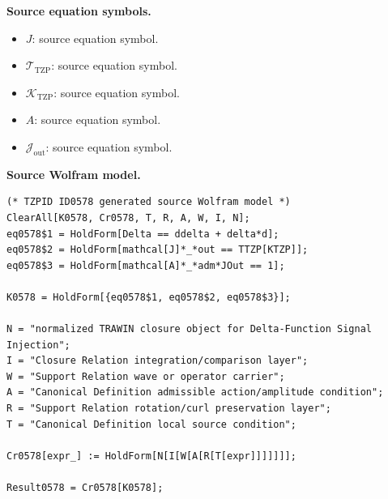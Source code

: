 \begin{minipage}[t]{0.49\linewidth}
\begingroup
\small
\raggedright
\textbf{Source equation symbols.}\par
\begin{itemize}[leftmargin=1.35em,itemsep=1pt,topsep=1pt,parsep=0pt]
    \item $J$: source equation symbol.
    \item $\mathcal{T}_{\mathrm{TZP}}$: source equation symbol.
    \item $\mathcal{K}_{\mathrm{TZP}}$: source equation symbol.
    \item $A$: source equation symbol.
    \item $\mathcal{J}_{\mathrm{out}}$: source equation symbol.
\end{itemize}
\endgroup
\end{minipage}\hfill
\begin{minipage}[t]{0.47\linewidth}
\begingroup
\scriptsize
\raggedright
\textbf{Source Wolfram model.}\par
\begin{Verbatim}[fontsize=\tiny,breaklines=true,breakanywhere=true]
(* TZPID ID0578 generated source Wolfram model *)
ClearAll[K0578, Cr0578, T, R, A, W, I, N];
eq0578$1 = HoldForm[Delta == ddelta + delta*d];
eq0578$2 = HoldForm[mathcal[J]*_*out == TTZP[KTZP]];
eq0578$3 = HoldForm[mathcal[A]*_*adm*JOut == 1];

K0578 = HoldForm[{eq0578$1, eq0578$2, eq0578$3}];

N = "normalized TRAWIN closure object for Delta-Function Signal Injection";
I = "Closure Relation integration/comparison layer";
W = "Support Relation wave or operator carrier";
A = "Canonical Definition admissible action/amplitude condition";
R = "Support Relation rotation/curl preservation layer";
T = "Canonical Definition local source condition";

Cr0578[expr_] := HoldForm[N[I[W[A[R[T[expr]]]]]]];

Result0578 = Cr0578[K0578];
\end{Verbatim}
\endgroup
\end{minipage}

